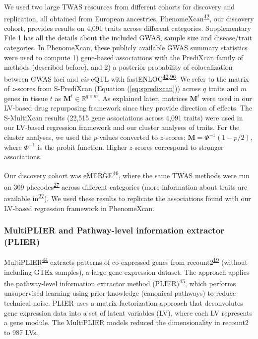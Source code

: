 \documentclass[
  a4paper,
]{article}
\begin{document}
We used two large TWAS resources from different cohorts for discovery and replication, all obtained from European ancestries.
PhenomeXcan\textsuperscript{\protect\hyperlink{ref-lY5ln3dB}{42}}, our discovery cohort, provides results on 4,091 traits across different categories.
Supplementary File 1 has all the details about the included GWAS, sample size and disease/trait categories.
In PhenomeXcan, these publicly available GWAS summary statistics were used to compute
1) gene-based associations with the PrediXcan family of methods (described before), and
2) a posterior probability of colocalization between GWAS loci and \emph{cis}-eQTL with fastENLOC\textsuperscript{\protect\hyperlink{ref-lY5ln3dB}{42},\protect\hyperlink{ref-ndd3tW4g}{96}}.
We refer to the matrix of \(z\)-scores from S-PrediXcan (Equation (\ref{eq:spredixcan})) across \(q\) traits and \(m\) genes in tissue \(t\) as \(\mathbf{M}^{t} \in \mathbb{R}^{q \times m}\).
As explained later, matrices \(\mathbf{M}^{t}\) were used in our LV-based drug repurposing framework since they provide direction of effects.
The S-MultiXcan results (22,515 gene associations across 4,091 traits) were used in our LV-based regression framework and our cluster analyses of traits.
For the cluster analyses, we used the \(p\)-values converted to \(z\)-scores: \(\mathbf{M}=\Phi^{-1}(1 - p/2)\), where \(\Phi^{-1}\) is the probit function.
Higher \(z\)-scores correspond to stronger associations.

Our discovery cohort was eMERGE\textsuperscript{\protect\hyperlink{ref-wfqjCerX}{46}}, where the same TWAS methods were run on 309 phecodes\textsuperscript{\protect\hyperlink{ref-gZAOkumx}{27}} across different categories (more information about traits are available in\textsuperscript{\protect\hyperlink{ref-gZAOkumx}{27}}).
We used these results to replicate the associations found with our LV-based regression framework in PhenomeXcan.

\hypertarget{sec:methods:multiplier}{%
\subsubsection{MultiPLIER and Pathway-level information extractor (PLIER)}\label{sec:methods:multiplier}}

MultiPLIER\textsuperscript{\protect\hyperlink{ref-14rnBunuZ}{44}} extracts patterns of co-expressed genes from recount2\textsuperscript{\protect\hyperlink{ref-6SPTvFXq}{19}} (without including GTEx samples), a large gene expression dataset.
The approach applies the pathway-level information extractor method (PLIER)\textsuperscript{\protect\hyperlink{ref-Ki2ij7zE}{45}}, which performs unsupervised learning using prior knowledge (canonical pathways) to reduce technical noise.
PLIER uses a matrix factorization approach that deconvolutes gene expression data into a set of latent variables (LV), where each LV represents a gene module.
The MultiPLIER models reduced the dimensionality in recount2 to 987 LVs.
\end{document}
